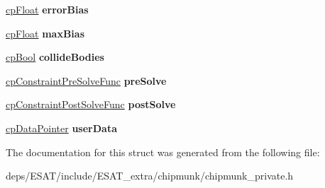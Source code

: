 \begin{DoxyCompactItemize}
\mbox{\hyperlink{group__basic_types_gac1ed65573e035bf892505768c852d8d3}{cp\+Float}} {\bfseries error\+Bias}
\item 
\mbox{\label{structcp_constraint_aac8ae38ee220e975dc4abbee86996e62}} 
\mbox{\hyperlink{group__basic_types_gac1ed65573e035bf892505768c852d8d3}{cp\+Float}} {\bfseries max\+Bias}
\item 
\mbox{\label{structcp_constraint_ab880cb8bb0edf163fdbaf7fd4368ea15}} 
\mbox{\hyperlink{group__basic_types_gabc5e752c48f3449ca26ef413ecbd647e}{cp\+Bool}} {\bfseries collide\+Bodies}
\item 
\mbox{\label{structcp_constraint_a4a9e75379d50abaf80662cad350324d6}} 
\mbox{\hyperlink{group__cp_constraint_gaf6038a155d58f45d6ab977dd1b1398de}{cp\+Constraint\+Pre\+Solve\+Func}} {\bfseries pre\+Solve}
\item 
\mbox{\label{structcp_constraint_a1be309feb59902e01cfcaeb5f6696930}} 
\mbox{\hyperlink{group__cp_constraint_ga2208378297a7265d0cc69f31697961b9}{cp\+Constraint\+Post\+Solve\+Func}} {\bfseries post\+Solve}
\item 
\mbox{\label{structcp_constraint_a4911f2a6b23b6c16fdd00443be4d002f}} 
\mbox{\hyperlink{group__basic_types_ga2ac2c3c31e21893941f9e4f8ee279447}{cp\+Data\+Pointer}} {\bfseries user\+Data}
\end{DoxyCompactItemize}


The documentation for this struct was generated from the following file\+:\begin{DoxyCompactItemize}
\item 
deps/\+E\+S\+A\+T/include/\+E\+S\+A\+T\+\_\+extra/chipmunk/chipmunk\+\_\+private.\+h\end{DoxyCompactItemize}
